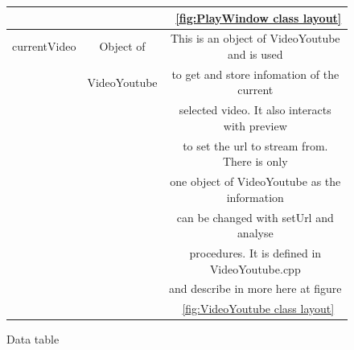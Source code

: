 \documentclass{article}
\begin{document}
\begin{figure}[H]
\begin{center}
\begin{tabular} { | c | c | c |}
                                             &&~\ref{fig:PlayWindow class layout}             \\ \hline
            currentVideo     &   Object of   &This is an object of VideoYoutube and is used   \\
                             &  VideoYoutube &to get and store infomation of the current      \\
                                             &&selected video. It also interacts with preview \\
                                             &&to set the url to stream from. There is only   \\
                                             &&one object of VideoYoutube as the information  \\
                                             &&can be changed with setUrl and analyse         \\
                                             &&procedures. It is defined in VideoYoutube.cpp  \\
                                             &&and describe in more here at figure            \\
                                             &&~\ref{fig:VideoYoutube class layout}           \\ \hline
        \end{tabular}
    \end{center}
    \caption{Data table} \label{fig:dataTable}
\end{figure}

\newpage
\end{document}
